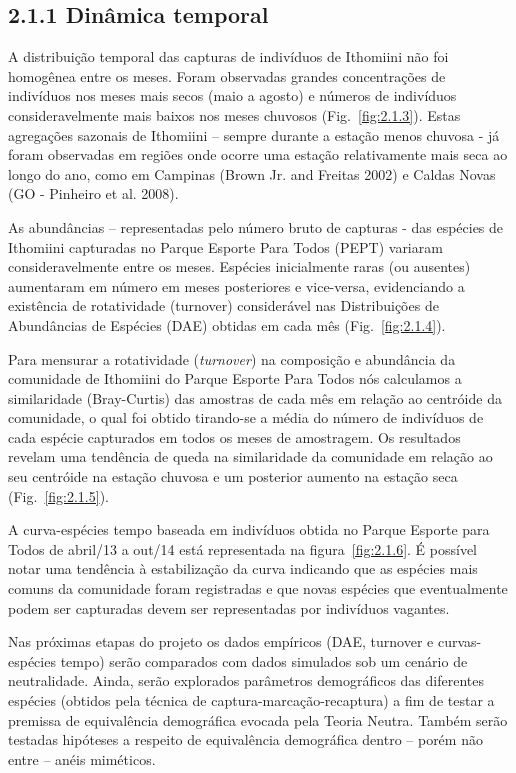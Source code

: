\subsection{2.1.1 Dinâmica temporal} %
\label{sec:din-temp-borb}
A distribuição temporal das capturas de indivíduos de Ithomiini não foi homogênea entre os meses. Foram observadas grandes concentrações de indivíduos nos meses mais secos (maio a agosto) e números de indivíduos consideravelmente mais baixos nos meses chuvosos 
(Fig.~\ref{fig:2.1.3}). Estas agregações sazonais de Ithomiini – sempre durante a estação menos chuvosa - já foram observadas em regiões onde ocorre uma estação relativamente mais seca ao longo do ano, como em Campinas (Brown Jr. and Freitas 2002) e Caldas Novas (GO - Pinheiro et al. 2008). 

As abundâncias – representadas pelo número bruto de capturas - das espécies de Ithomiini capturadas no Parque Esporte Para Todos (PEPT) variaram consideravelmente entre os meses. Espécies inicialmente raras (ou ausentes) aumentaram em número em meses posteriores e vice-versa, evidenciando a existência de rotatividade (turnover) considerável nas Distribuições de Abundâncias de Espécies (DAE) obtidas em cada mês (Fig.~\ref{fig:2.1.4}).  

Para mensurar a rotatividade (\textit{turnover}) na composição e abundância da comunidade de Ithomiini do Parque Esporte Para Todos nós calculamos a similaridade (Bray-Curtis) das amostras de cada mês em relação ao centróide da comunidade, o qual foi obtido tirando-se a média do número de indivíduos de cada espécie capturados em todos os meses de amostragem. Os resultados revelam uma tendência de queda na similaridade da comunidade em relação ao seu centróide na estação chuvosa e um posterior aumento na estação seca
(Fig.~\ref{fig:2.1.5}).

A curva-espécies tempo baseada em indivíduos obtida no Parque Esporte para Todos de abril/13 a out/14 está representada na 
figura~\ref{fig:2.1.6}. É possível notar uma tendência à estabilização da curva indicando que as espécies mais comuns da comunidade foram registradas e que novas espécies que eventualmente podem ser capturadas devem ser representadas por indivíduos vagantes.

Nas próximas etapas do projeto os dados empíricos (DAE, turnover e curvas-espécies tempo) serão comparados com dados simulados sob um cenário de neutralidade. Ainda, serão explorados parâmetros demográficos das diferentes espécies (obtidos pela técnica de captura-marcação-recaptura) a fim de testar a premissa de equivalência demográfica evocada pela Teoria Neutra. Também serão testadas hipóteses a respeito de equivalência demográfica dentro – porém não entre – anéis miméticos.


